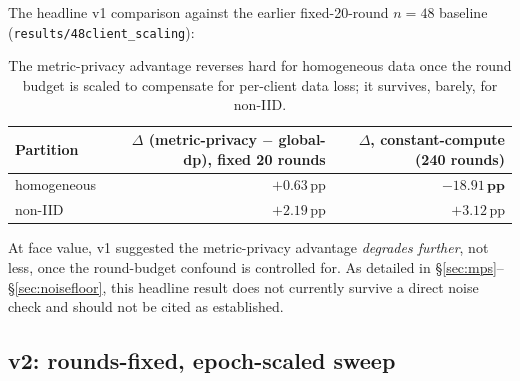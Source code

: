 \documentclass[11pt]{article}
\newcommand{\code}[1]{\texttt{#1}}
\newcommand{\pp}{\,\text{pp}}
\begin{document}
\noindent The headline v1 comparison against the earlier fixed-20-round $n{=}48$ baseline
(\code{results/48client\_scaling}):

\begin{table}[h]
\centering
\small
\begin{tabular}{lrr}
\toprule
Partition & $\Delta$ (metric-privacy $-$ global-dp), fixed 20 rounds & $\Delta$, constant-compute (240 rounds) \\
\midrule
homogeneous & $+0.63\pp$ & $\mathbf{-18.91\pp}$ \\
non-IID     & $+2.19\pp$ & $+3.12\pp$ \\
\bottomrule
\end{tabular}
\caption{The metric-privacy advantage reverses hard for homogeneous data once the round budget is
scaled to compensate for per-client data loss; it survives, barely, for non-IID.}
\label{tab:v1-delta}
\end{table}

At face value, v1 suggested the metric-privacy advantage \emph{degrades further}, not less, once
the round-budget confound is controlled for. As detailed in \S\ref{sec:mps}--\S\ref{sec:noisefloor},
this headline result does not currently survive a direct noise check and should not be cited as
established.

\subsection{v2: rounds-fixed, epoch-scaled sweep}
\label{sec:v2findings}
\end{document}
